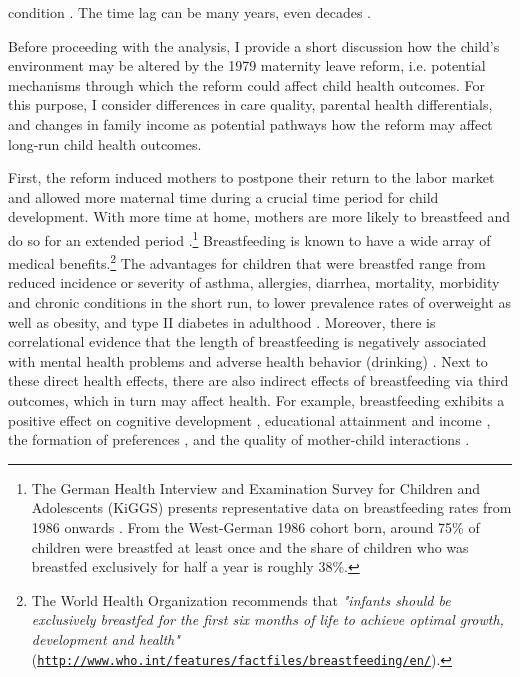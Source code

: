 \documentclass[11pt, a4paper,draft]{article} %
\begin{document}
condition \citep{almond2011fetalorigins}. The time lag can be many years, even decades \citep{shonkoff2009neuroscience}.\newline


Before proceeding with the analysis, I provide a short discussion how the child's environment may be altered by the 1979 maternity leave reform, i.e. potential mechanisms through which the reform could affect child health outcomes. For this purpose, I consider differences in care quality, parental health differentials, and changes in family income as potential pathways how the reform may affect long-run child health outcomes. \newline %

First, the reform induced mothers to postpone their return to the labor market and allowed more maternal time during a crucial time period for child development. With more time at home, mothers are more likely to breastfeed and do so for an extended period \citep{baker2008maternal,berger2005earlymaternal}.\footnote{The German Health Interview and Examination Survey for Children and Adolescents (KiGGS) presents representative data on breastfeeding rates from 1986 onwards \citep{lange2007breastfeeding}. From the West-German 1986 cohort born, around 75\% of children were breastfed at least once and the share of children who was breastfed exclusively for half a year is roughly 38\%.} Breastfeeding is known to have a wide array of medical benefits.\footnote{The World Health Organization recommends that \textit{"infants should be exclusively breastfed for the first six months of life to achieve optimal growth, development and health"} (\href{http://www.who.int/features/factfiles/breastfeeding/en/}{\nolinkurl{http://www.who.int/features/factfiles/breastfeeding/en/}}).} The advantages for children that were breastfed range from reduced incidence or severity of asthma, allergies, diarrhea, mortality, morbidity and chronic conditions in the short run, to lower prevalence rates of overweight as well as obesity, and type II diabetes in adulthood \citep{ruhm2000parental, victora2016breastfeeding}. Moreover, there is correlational evidence that the length of breastfeeding is negatively associated with mental health problems and adverse health behavior (drinking) \citep{oddy2010longterm,falk2016early}. Next to these direct health effects, there are also indirect effects of breastfeeding via third outcomes, which in turn may affect health. For example, breastfeeding exhibits a positive effect on cognitive development \citep{albagli2018}, educational attainment and income \citep{victoria2015association}, the formation of preferences \citep{falk2016early}, and the quality of mother-child interactions \citep{papp2014longitudinal}. \newline 
\end{document}
